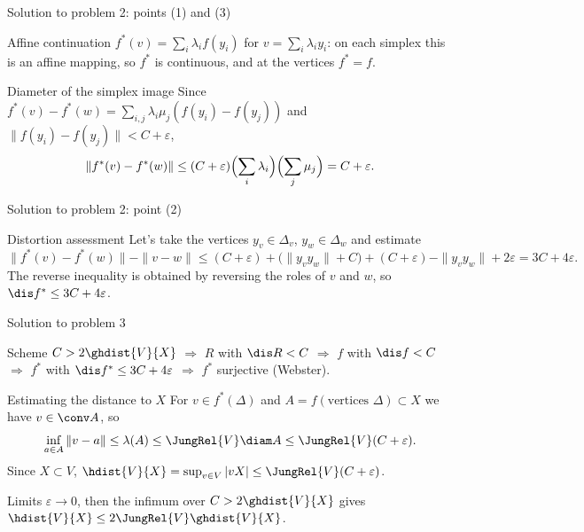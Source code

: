 \documentclass[aspectratio=169,11pt]{beamer}
\begin{document}
\begin{frame}{Solution to problem \textup{2}: points \textup{(1)} and \textup{(3)}}
\begin{block}{Affine continuation}
$f^*(v) = \sum_i \lambda_i f(y_i)$ for $v = \sum_i \lambda_i y_i$\textup{:} on each simplex this is an affine mapping, so $f^*$ is continuous, and at the vertices $f^* = f$.
\end{block}
\begin{block}{Diameter of the simplex image}
Since $f^*(v) - f^*(w) = \sum_{i,j}\lambda_i\mu_j(f(y_i)-f(y_j))$ and $\|f(y_i)-f(y_j)\| < C+\varepsilon$,
\[
\|f^*(v)-f^*(w)\| \le (C+\varepsilon)\Bigl(\sum_i\lambda_i\Bigr)\Bigl(\sum_j\mu_j\Bigr) = C+\varepsilon .
\]
\end{block}
\end{frame}

\begin{frame}{Solution to problem \textup{2}: point \textup{(2)}}
\begin{block}{Distortion assessment}
Let's take the vertices $y_v \in \Delta_v$, $y_w \in \Delta_w$ and estimate
\[
\|f^*(v)-f^*(w)\| - \|v-w\| \le (C+\varepsilon) + \bigl(\|y_vy_w\| + C\bigr) + (C+\varepsilon) - \|y_vy_w\| + 2\varepsilon = 3C+4\varepsilon .
\]
The reverse inequality is obtained by reversing the roles of $v$ and $w$, so $\dis f^* \le 3C + 4\varepsilon$.
\end{block}
\end{frame}

\begin{frame}{Solution to problem \textup{3}}
\begin{block}{Scheme}
$C > 2\ghdist{V}{X}$ $\Rightarrow$ $R$ with $\dis R < C$ $\Rightarrow$ $f$ with $\dis f < C$ $\Rightarrow$ $f^*$ with $\dis f^* \le 3C+4\varepsilon$ $\Rightarrow$ $f^*$ surjective \textup{(}Webster\textup{)}.
\end{block}
\begin{block}{Estimating the distance to $X$}
For $v \in f^*(\Delta)$ and $A = f(\text{vertices }\Delta) \subset X$ we have $v \in \conv A$, so
\[
\inf_{a \in A}\|v-a\| \le \lambda(A) \le \JungRel{V}\diam A \le \JungRel{V}(C+\varepsilon).
\]
Since $X \subset V$, $\hdist{V}{X} = \sup_{v \in V}|vX| \le \JungRel{V}(C+\varepsilon)$.
\end{block}
\begin{block}{Limits}
$\varepsilon \to 0$, then the infimum over $C > 2\ghdist{V}{X}$ gives $\hdist{V}{X} \le 2\JungRel{V}\ghdist{V}{X}$.
\end{block}
\end{frame}
\end{document}
